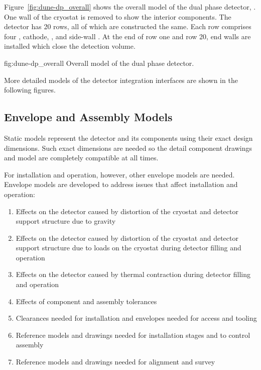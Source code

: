 Figure~\ref{fig:dune-dp_overall} shows the overall model of the dual
phase detector, . One wall of the cryostat is removed to
show the interior components. The detector has 20 rows, all of which
are constructed the same. Each row comprises four ,
cathode, ,  and side-wall .  At the
end of row one and row 20, end walls are installed which close the
detection volume.
\begin{dunefigure}{fig:dune-dp_overall}
  {Overall model of the dual phase detector.}
\end{dunefigure}


More detailed models of the  detector integration
interfaces are shown in the following figures.

\subsection{Envelope and Assembly Models}
\label{sec:fdsp-coord-integ-envelope}

Static models represent the detector and its components using their exact
design dimensions. Such exact dimensions are needed so the
detail component drawings and model are completely compatible at all
times.


For installation and operation, however, other envelope models are
needed. Envelope models are developed to address issues that affect
installation and operation:
\begin{enumerate}
 \item Effects on the detector caused by distortion of the cryostat
   and detector support structure due to gravity
 \item Effects on the detector caused by distortion of the cryostat
   and detector support structure due to loads on the cryostat during
   detector filling and operation
 \item Effects on the detector caused by thermal contraction during
   detector filling and operation
 \item Effects of component and
   assembly tolerances
 \item Clearances needed for installation and envelopes needed for
   access and tooling
 \item Reference models and drawings needed for installation stages
   and to control assembly
 \item Reference models and drawings needed for alignment and survey
\end{enumerate}


